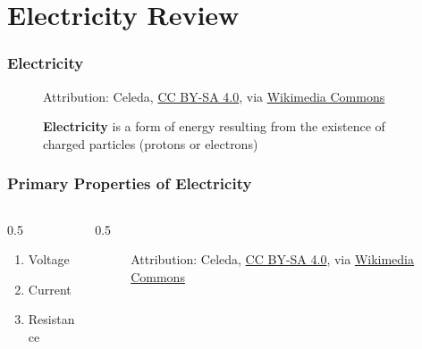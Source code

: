 \section{Electricity Review}

\begin{frame}
    \frametitle{Electricity}
    \begin{figure}
        \centering

        
        {\tiny Attribution: Celeda, \href{https://creativecommons.org/licenses/by-sa/4.0}{CC BY-SA 4.0}, via \href{https://commons.wikimedia.org/wiki/File:Arc_\%C3\%A9lectrique_double.jpg}{Wikimedia Commons}\par}
        {\footnotesize \textbf{Electricity} is a form of energy resulting from the existence of charged particles (protons or electrons)\par}
    \end{figure}
\end{frame}

\begin{frame}
    \frametitle{Primary Properties of Electricity}
	\begin{columns}
	\begin{column}{0.5\linewidth}
        \begin{enumerate}[<+- | alert@+>]
            \item{Voltage}
            \item{Current}
            \item{Resistance}
        \end{enumerate}
	\end{column}
	\begin{column}{0.5\linewidth}
		\begin{figure}
            \centering

            {\tiny Attribution: Celeda, \href{https://creativecommons.org/licenses/by-sa/4.0}{CC BY-SA 4.0}, via \href{https://commons.wikimedia.org/wiki/File:Arc_\%C3\%A9lectrique_double.jpg}{Wikimedia Commons}\par}
        \end{figure}
	\end{column}
	\end{columns}
\end{frame}

